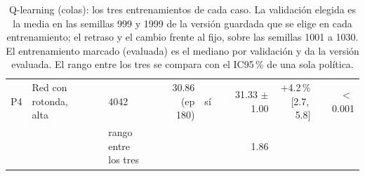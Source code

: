 \begin{table}[H]
\begin{tabular}{lllrlrrr}
P4 & \makecell[l]{Red con rotonda,\\{}alta} & 4042 & \makecell[r]{30.86\\{}(ep 180)} & sí & \makecell[r]{31.33\\{}$\pm$ 1.00} & \makecell[r]{+4.2\,\%\\{}[2.7,\,5.8]} & $<$\,0.001 \\
 & & \makecell[l]{rango entre\\{}los tres} & & & 1.86 & & \\
\bottomrule
\end{tabular}
\caption[Entrenamientos de Q-learning (colas)]{Q-learning (colas): los tres entrenamientos de cada caso. La validación elegida es la media en las semillas 999 y 1999 de la versión guardada que se elige en cada entrenamiento; el retraso y el cambio frente al fijo, sobre las semillas 1001 a 1030. El entrenamiento marcado (evaluada) es el mediano por validación y da la versión evaluada. El rango entre los tres se compara con el IC95\,\% de una sola política.}
\label{tab:veredicto-bases-ql-colas}
\end{table}


